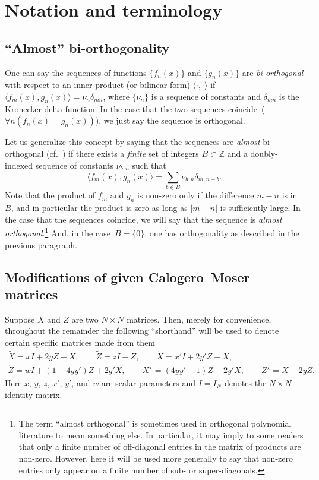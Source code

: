 \documentclass[10pt,a4paper]{amsart}
\numberwithin{equation}{section}
\theoremstyle{definition}
\begin{document}
\section{Notation and terminology}

\subsection{``Almost'' bi-orthogonality}\label{sec:almostdef}

One can say the
sequences of functions $\{f_n(x)\}$ and $\{g_n(x)\}$ are \textit{bi-orthogonal}
with respect to an inner product (or bilinear form) $\langle
\cdot,\cdot\rangle$ if~$
\langle f_m(x),g_n(x)\rangle = \nu_n \delta_{mn}
$,
where $\{\nu_n\}$ is a sequence of constants and $\delta_{mn}$ is the Kronecker delta function. In the case that the
two sequences coincide~($\forall n(f_n(x)=g_n(x))$), we just say the
sequence is orthogonal.

Let us generalize this concept by saying that the sequences are \textit{almost}
bi-orthogonal (cf.~\cite{BaileyDerev})
if there exists a \textit{finite} set of integers
$B\subset\mathbb{Z}$ and a doubly-indexed sequence of constants
$\nu_{b,n}$ such that
\[
\langle f_m(x),g_n(x)\rangle = \sum_{b\in B}\nu_{b,n} \delta_{m,n+b}.
\]
Note that the product of $f_m$ and $g_n$ is non-zero only if the
difference $m-n$ is in $B$, and in particular the product is zero as
long as $|m-n|$ is sufficiently large. In the case that the sequences
coincide, we will say that the sequence is \textit{almost
 orthogonal}.\footnote{The term ``almost orthogonal'' is sometimes used in
 orthogonal polynomial literature to mean something else. In
 particular, it may imply to some readers that only a finite number
 of off-diagonal entries in the matrix of products are non-zero.
 However, here it will be used more generally to say that non-zero
 entries only appear on a finite number of sub- or super-diagonals.} And, in the case~$B=\{0\}$, one has orthogonality as
described in the previous paragraph.





\subsection{Modifications of given Calogero--Moser matrices}\label{sec:tilde}

Suppose $X$ and $Z$ are two $N\times N$ matrices. Then, merely for
convenience, throughout the remainder the
following ``shorthand'' will be used to denote certain specific
matrices made from them
\begin{gather*}
\tilde X=xI+2yZ-X,\qquad
\tilde Z=zI-Z,
\qquad
\acute X=x'I+2y'Z-X,\\
\acute Z=w I+(1-4yy')Z+2y'X,
\qquad
X^\star=(4yy'-1)Z-2y'X,\qquad Z^\star=X-2yZ.
\end{gather*}
Here
$x$, $y$, $z$, $x'$, $y'$, and $w$ are scalar parameters
and $I=I_N$ denotes the $N\times N$ identity matrix.
\end{document}
